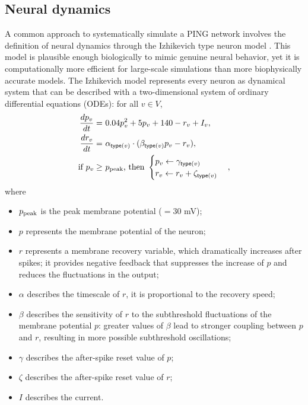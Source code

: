 \subsection{Neural dynamics}
\label{sec:neural-dynamics}

A common approach to systematically simulate a PING network involves the definition of neural dynamics through the Izhikevich type neuron model  \cite{Izhikevich2003}. This model is plausible enough biologically to mimic genuine neural behavior, yet it is computationally more efficient for large-scale simulations than more biophysically accurate models. The Izhikevich model represents every neuron as dynamical system that can be described with a two-dimensional system of ordinary differential equations (ODEs): for all $v \in V$,
\begin{align}
    \frac{dp_v}{dt} =\ & 0.04 p_v^2 + 5p_v + 140 - r_v + I_v,
    \label{eq:Izhikevich-model-dp-dt} \\
    \frac{dr_v}{dt} =\ & \alpha_{\mathsf{type}(v)} \cdot (\beta_{\mathsf{type}(v)} p_v - r_v), \label{eq:Izhikevich-model-dr-dt} \\
    \text{if } p_v \geq\ & p_{\mathrm{peak}} \text{, then } 
    \begin{cases}
        p_v \leftarrow \gamma_{\mathsf{type}(v)} \\
        r_v \leftarrow r_v + \zeta_{\mathsf{type}(v)}
    \end{cases}, 
    \label{eq:Izhikevich-model-p30}
\end{align}
where
\begin{itemize}
    \item $p_{\mathrm{peak}}$ is the peak membrane potential ($= 30$ mV);
    
    \item $p$ represents the membrane potential of the neuron; 
    
    \item $r$ represents a membrane recovery variable, which dramatically increases after spikes; it provides negative feedback that suppresses the increase of $p$ and reduces the fluctuations in the output;
    
    \item $\alpha$ describes the timescale of $r$, it is proportional to the recovery speed;
    
    \item $\beta$ describes the sensitivity of $r$ to the subthreshold fluctuations of the membrane potential $p$: greater values of $\beta$ lead to stronger coupling between $p$ and $r$, resulting in more possible subthreshold oscillations;
    
    \item $\gamma$ describes the after-spike reset value of $p$;
    
    \item $\zeta$ describes the after-spike reset value of $r$;
    
    \item $I$ describes the current.
\end{itemize}
